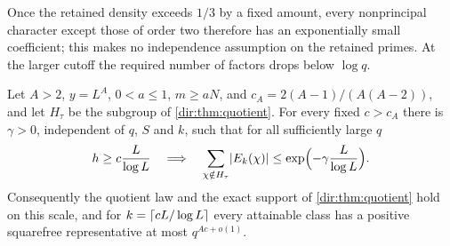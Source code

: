Once the retained density exceeds $1/3$ by a fixed amount, every nonprincipal character except
those of order two therefore has an exponentially small coefficient; this makes no independence
assumption on the retained primes. At the larger cutoff the required number of factors drops
below $\log q$.

\begin{theorem}\label{dir:thm:short}
Let $A>2$, $y=L^A$, $0<a\le1$, $m\ge aN$, and $c_A=2(A-1)/(A(A-2))$, and let $H_\tau$ be the
subgroup of \cref{dir:thm:quotient}. For every fixed $c>c_A$ there is $\gamma>0$, independent of
$q$, $S$ and $k$, such that for all sufficiently large $q$
\[
 h\ge c\frac{L}{\log L}\quad\Longrightarrow\quad
 \sum_{\chi\notin H_\tau}\lvert E_k(\chi)\rvert\le\exp\Bigl(-\gamma\frac L{\log L}\Bigr).
\]
Consequently the quotient law and the exact support of \cref{dir:thm:quotient} hold on this
scale, and for $k=\lceil cL/\log L\rceil$ every attainable class has a positive squarefree
representative at most $q^{Ac+o(1)}$.
\end{theorem}

